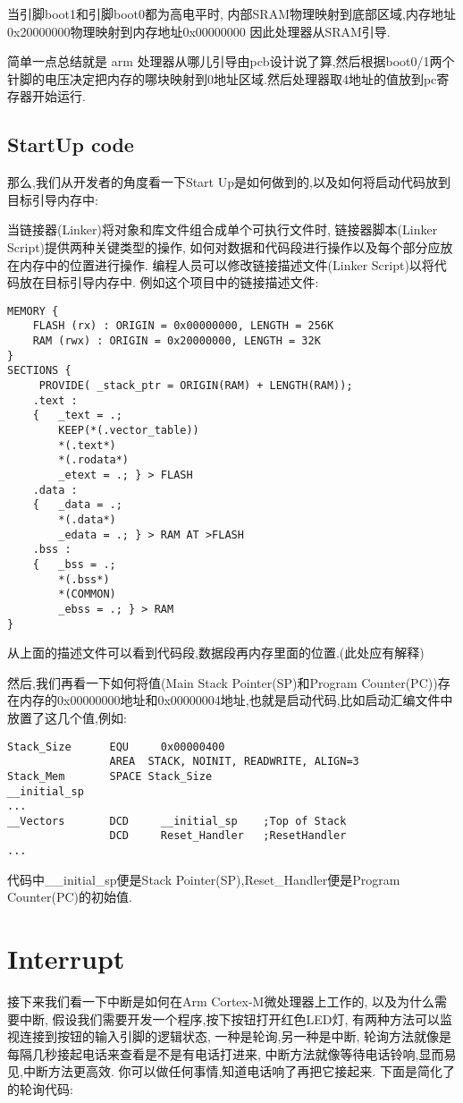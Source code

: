 当引脚boot1和引脚boot0都为高电平时,
内部SRAM物理映射到底部区域,内存地址0x20000000物理映射到内存地址0x00000000
因此处理器从SRAM引导.

简单一点总结就是 arm 处理器从哪儿引导由pcb设计说了算,然后根据boot0/1两个针脚的电压决定把内存的哪块映射到0地址区域.然后处理器取4地址的值放到pc寄存器开始运行.

\subsection{StartUp code}

那么,我们从开发者的角度看一下Start Up是如何做到的,以及如何将启动代码放到目标引导内存中:

当链接器(Linker)将对象和库文件组合成单个可执行文件时,
链接器脚本(Linker Script)提供两种关键类型的操作,
如何对数据和代码段进行操作以及每个部分应放在内存中的位置进行操作.
编程人员可以修改链接描述文件(Linker Script)以将代码放在目标引导内存中.
例如这个项目中的链接描述文件:

\begin{lstlisting}
MEMORY {
    FLASH (rx) : ORIGIN = 0x00000000, LENGTH = 256K
    RAM (rwx) : ORIGIN = 0x20000000, LENGTH = 32K
}
SECTIONS { 
     PROVIDE( _stack_ptr = ORIGIN(RAM) + LENGTH(RAM));
    .text :
    {   _text = .;
        KEEP(*(.vector_table))
        *(.text*)
        *(.rodata*)
        _etext = .; } > FLASH
    .data : 
    {   _data = .;
        *(.data*)  
        _edata = .; } > RAM AT >FLASH
    .bss :
    {   _bss = .;
        *(.bss*)
        *(COMMON)       
        _ebss = .; } > RAM
}
\end{lstlisting}

从上面的描述文件可以看到代码段,数据段再内存里面的位置.(此处应有解释)


然后,我们再看一下如何将值(Main Stack Pointer(SP)和Program Counter(PC))存在内存的0x00000000地址和0x00000004地址,也就是启动代码,比如启动汇编文件中放置了这几个值,例如:
\begin{lstlisting}[language={[ANSI]C}]
Stack_Size      EQU     0x00000400
                AREA  STACK, NOINIT, READWRITE, ALIGN=3
Stack_Mem       SPACE Stack_Size
__initial_sp
...
__Vectors       DCD     __initial_sp    ;Top of Stack
                DCD     Reset_Handler   ;ResetHandler
...
\end{lstlisting}

代码中\_\_initial\_sp便是Stack Pointer(SP),Reset\_Handler便是Program Counter(PC)的初始值.


\section{Interrupt}
接下来我们看一下中断是如何在Arm Cortex-M微处理器上工作的,
以及为什么需要中断,
假设我们需要开发一个程序,按下按钮打开红色LED灯,
有两种方法可以监视连接到按钮的输入引脚的逻辑状态,
一种是轮询,另一种是中断,
轮询方法就像是每隔几秒接起电话来查看是不是有电话打进来,
中断方法就像等待电话铃响,显而易见,中断方法更高效.
你可以做任何事情,知道电话响了再把它接起来.
下面是简化了的轮询代码:

